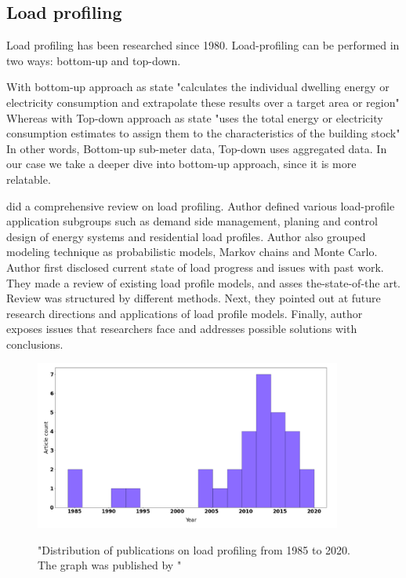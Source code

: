 \documentclass[
11pt, %
english, %
singlespacing, %
headsepline, %
]{MastersDoctoralThesis} %
\begin{document}
\subsection{Load profiling}

Load profiling has been researched since 1980. Load-profiling can be performed in two ways: bottom-up and top-down. 

With bottom-up approach as \cite{SWAN20091819} state "calculates the individual dwelling energy or electricity consumption and extrapolate these results over a target area or region"
Whereas with Top-down approach as \cite{SWAN20091819} state "uses the total energy or electricity consumption estimates to assign them to the characteristics of the building stock"
In other words, Bottom-up sub-meter data, Top-down uses aggregated data. In our case we take a deeper dive into bottom-up approach, since it is more relatable.

\cite{Review2021} did a comprehensive review on load profiling. Author defined various load-profile application
subgroups such as demand side management, planing and control design of energy systems and residential load profiles. Author also 
grouped modeling technique as probabilistic models, Markov chains and Monte Carlo. Author first disclosed current state of load progress and issues with past work. They made a review of existing load profile models,
and asses the-state-of-the art. Review was structured by different methods. Next, they pointed out at future research directions
and applications of load profile models. Finally, author exposes issues that researchers face and addresses possible solutions with conclusions.

\begin{figure}[h!]
	\centering
	\caption{"Distribution of publications on load profiling from 1985 to 2020. The graph was published by \protect\cite{Review2021}"}
	\includegraphics[width=0.9\textwidth]{Figures/publications.png}
	\label{fig:Distribution}
\end{figure}
\end{document}
